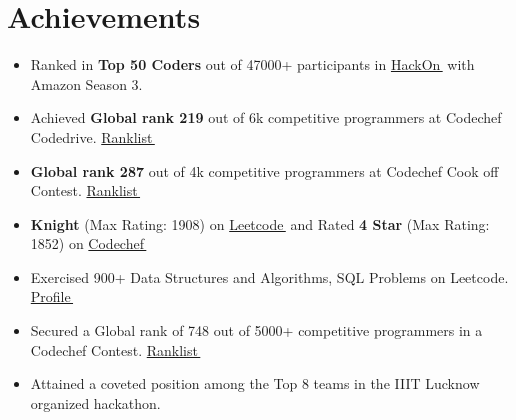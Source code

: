 \documentclass[letterpaper,11pt]{article}
\let\orighref\href
\renewcommand{\href}[2]{\orighref{#1}{#2\,\faExternalLink}}
\begin{document}
\section{Achievements}
\smallskip
\begin{itemize}[noitemsep]
\item{
   {
   Ranked in \textbf{Top 50 Coders} out of 47000+ participants in \href{https://docs.google.com/spreadsheets/d/e/2PACX-1vRyP-Xle6mZUD6hrYjNmPc0nf_VXc0v7yKkenwl29oK_r0iqtBGQf8GBIm1HUSEAtCCmqxtFT9Ak3oo/pubhtml}{HackOn} with Amazon Season 3. 
   }
}
  \item{
     { Achieved \textbf{Global rank 219} out of 6k competitive programmers at Codechef Codedrive. \href{https://www.codechef.com/rankings/CDRV21C?itemsPerPage=100&order=asc&page=64&sortBy=rank}{Ranklist}}
  }
  \item{ 
     {\textbf{Global rank 287} out of 4k competitive programmers at Codechef Cook off Contest. \href{https://www.codechef.com/rankings/CDRV21C?itemsPerPage=100&order=asc&page=64&sortBy=rank}{ Ranklist}}
  }
  
  \item{
  \textbf{Knight} (Max Rating: 1908) on \href{https://leetcode.com/shankar999/}{Leetcode} and 
     {Rated\textbf{ 4 Star} (Max Rating: 1852) on  \href{https://www.codechef.com/users/shankar999}{Codechef}}
  }
  \item{
     {Exercised 900+ Data Structures and Algorithms, SQL Problems on Leetcode. \href{https://leetcode.com/shankar999/}{ Profile}}
  }
  \item{
     {Secured a Global rank of 748 out of 5000+ competitive programmers in a Codechef Contest. \href{https://www.codechef.com/rankings/COOK137B?itemsPerPage=100&order=asc&page=47&sortBy=rank}{ Ranklist}}
  }
  \item {
  Attained a coveted position among the Top 8 teams in the IIIT Lucknow organized hackathon.
  }
\end{itemize}

\end{document}
